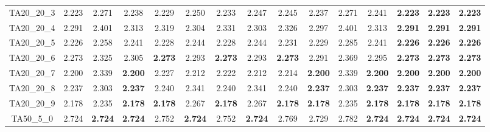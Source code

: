 \begin{tabular}{cc||ccccccccccccc}
TA20\_20\_3        & 2.223            & 2.271            & 2.238            & 2.229            & 2.250            & 2.233            & 2.247            & 2.245            & 2.237            & 2.271            & 2.241            & {\bf 2.223}      & {\bf 2.223}      & {\bf 2.223}     \\ 
TA20\_20\_4        & 2.291            & 2.401            & 2.313            & 2.319            & 2.304            & 2.331            & 2.303            & 2.326            & 2.297            & 2.401            & 2.313            & {\bf 2.291}      & {\bf 2.291}      & {\bf 2.291}     \\ 
TA20\_20\_5        & 2.226            & 2.258            & 2.241            & 2.228            & 2.244            & 2.228            & 2.244            & 2.231            & 2.229            & 2.285            & 2.241            & {\bf 2.226}      & {\bf 2.226}      & {\bf 2.226}     \\ 
TA20\_20\_6        & 2.273            & 2.325            & 2.305            & {\bf 2.273}      & 2.293            & {\bf 2.273}      & 2.293            & {\bf 2.273}      & 2.291            & 2.369            & 2.295            & {\bf 2.273}      & {\bf 2.273}      & {\bf 2.273}     \\ 
TA20\_20\_7        & 2.200            & 2.339            & {\bf 2.200}      & 2.227            & 2.212            & 2.222            & 2.212            & 2.214            & {\bf 2.200}      & 2.339            & {\bf 2.200}      & {\bf 2.200}      & {\bf 2.200}      & {\bf 2.200}     \\ 
TA20\_20\_8        & 2.237            & 2.303            & {\bf 2.237}      & 2.240            & 2.341            & 2.240            & 2.341            & 2.240            & {\bf 2.237}      & 2.303            & {\bf 2.237}      & {\bf 2.237}      & {\bf 2.237}      & {\bf 2.237}     \\ 
TA20\_20\_9        & 2.178            & 2.235            & {\bf 2.178}      & {\bf 2.178}      & 2.267            & {\bf 2.178}      & 2.267            & {\bf 2.178}      & {\bf 2.178}      & 2.235            & {\bf 2.178}      & {\bf 2.178}      & {\bf 2.178}      & {\bf 2.178}     \\ 
TA50\_5\_0         & 2.724            & {\bf 2.724}      & {\bf 2.724}      & 2.752            & {\bf 2.724}      & 2.752            & {\bf 2.724}      & 2.769            & 2.729            & 2.782            & {\bf 2.724}      & {\bf 2.724}      & {\bf 2.724}      & {\bf 2.724}     \\ 

\end{tabular}
